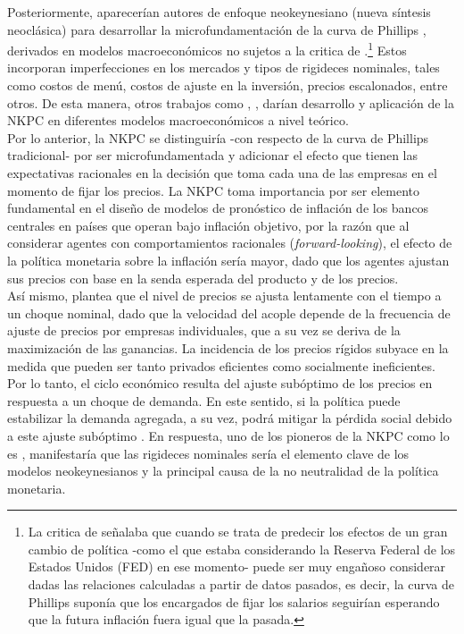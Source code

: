 Posteriormente, aparecerían autores de enfoque neokeynesiano (nueva síntesis neoclásica)  para desarrollar la microfundamentación de la curva de Phillips \citep{woodford1998control,goodfriend1997new,clarida1999science}, derivados en modelos macroeconómicos no sujetos a la critica de \cite{lucas1976econometric}.\footnote{La critica de \cite{lucas1976econometric} señalaba que cuando se trata de predecir los efectos de un gran cambio de política -como el que estaba considerando la Reserva Federal de los Estados Unidos (FED) en ese momento- puede ser muy engañoso considerar dadas las relaciones calculadas a partir de datos pasados, es decir, la curva de Phillips  suponía que los encargados de fijar los salarios seguirían esperando que la futura inflación fuera igual que la pasada.} Estos incorporan imperfecciones en los mercados y tipos de rigideces nominales,  tales como costos de menú, costos de ajuste en la inversión, precios escalonados, entre otros. De esta manera, otros trabajos como \cite{fuhrer1995inflation}, \cite{yun1996nominal}, \cite{king1999should} darían desarrollo y aplicación de la NKPC en diferentes modelos macroeconómicos a nivel teórico.\\
 
Por lo anterior, la NKPC se distinguiría -con respecto de la curva de Phillips tradicional- por ser microfundamentada y adicionar el efecto que tienen las expectativas racionales en la decisión que toma cada una de las empresas en el momento de fijar los precios. La NKPC toma importancia por ser elemento fundamental en el diseño de modelos de pronóstico de inflación de los bancos centrales en países que operan bajo inflación objetivo, por la razón que al considerar agentes con comportamientos racionales (\textit{forward-looking}), el efecto de la política monetaria sobre la inflación sería mayor, dado que los agentes ajustan sus precios con base en la senda esperada del producto y de los precios. \\

Así mismo, \cite{ball1988new} plantea que el nivel de precios se ajusta lentamente con el tiempo a un choque nominal, dado que la velocidad del acople depende de la frecuencia de ajuste de precios por empresas individuales, que a su vez se deriva de la maximización de las ganancias. La incidencia de los precios rígidos subyace en la medida que  pueden ser tanto privados eficientes como socialmente ineficientes. Por lo tanto, el ciclo económico resulta del ajuste subóptimo de los precios en respuesta a un choque de demanda. En este sentido, si la política puede estabilizar la demanda agregada, a su vez, podrá mitigar la pérdida social debido a este ajuste subóptimo \citep{mankiw1985small}. En respuesta, uno de los pioneros de la NKPC como lo es \cite{gali2010new}, manifestaría que las rigideces nominales sería el elemento clave de los modelos neokeynesianos y  la principal causa de la no neutralidad de la política monetaria.\\

